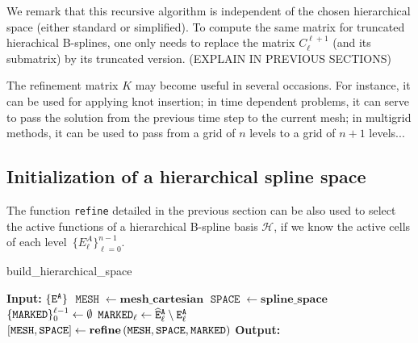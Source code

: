 \documentclass[a4paper]{siamltex1213}
\newcommand{\Rd}{\color{red}}
\renewcommand{\Rd}{\color{black}}
\newcommand{\activeelements}[1]{\tt E^A_{#1}}
\DeclareMathOperator\mesh{\texttt{MESH}}
\DeclareMathOperator\basis{\texttt{SPACE}}
\DeclareMathOperator\marked{\tt MARKED}
\newcommand\QQ{\mathcal Q}
\newcommand\HH{\mathcal H}
\let\hat\widehat
\begin{document}
We remark that this recursive algorithm is independent of the chosen hierarchical space (either standard or simplified). To compute the same matrix for truncated hierachical B-splines, one only needs to replace the matrix $C_\ell^{\ell+1}$ (and its submatrix) by its truncated version. {\Rd (EXPLAIN IN PREVIOUS SECTIONS)}

The refinement matrix $K$ may become useful in several occasions. For instance, it can be used for applying knot insertion; in time dependent problems, it can serve to pass the solution from the previous time step to the current mesh; in multigrid methods, it can be used to pass from a grid of $n$ levels to a grid of $n+1$ levels...

\subsection{Initialization of a hierarchical spline space}

The function \texttt{refine} detailed in the previous section can be also used to select the active functions of a hierarchical B-spline basis $\HH$, if we know the active cells of each level~$\{E^A_\ell\}_{\ell=0}^{n-1}$. 

\begin{algorithm}
\caption{build\_hierarchical\_space}
\begin{algorithmic}[1]
\Statex \textbf{Input:} $\{\activeelements{ }\}$
\State $\mesh \gets \textbf{mesh\_cartesian}$  
\State $\basis \gets \textbf{spline\_space}$  
  \State $\{\marked\}_0^{\ell-1} \gets \emptyset$
  \State $\marked_\ell \gets \tt{\hat E^A_\ell} \setminus \activeelements{\ell}$
  \State $[\mesh, \basis] \gets \textbf{refine} \, (\mesh, \basis, \marked)$
\EndFor
\Statex \textbf{Output:}
\end{algorithmic}
\end{algorithm}


\end{document}
